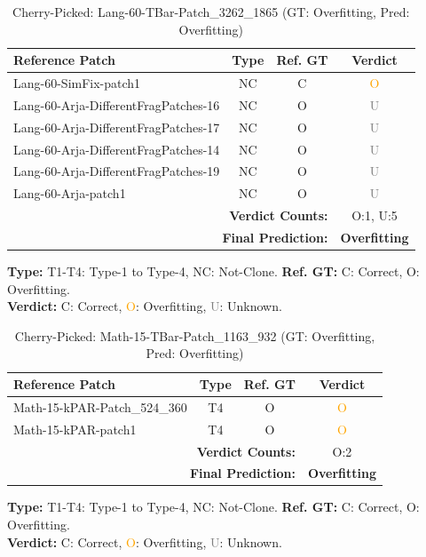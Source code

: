 \begin{table}[t]
\centering
\caption{Cherry-Picked: Lang-60-TBar-Patch\_3262\_1865 (GT: Overfitting, Pred: Overfitting)}
\label{tab:cherry-Lang60TBarPatch32621865}
\footnotesize
\renewcommand{\arraystretch}{1.1}
\setlength{\tabcolsep}{4pt}
\begin{tabular}{l|c|c|c}
\hline
\textbf{Reference Patch} & \textbf{Type} & \textbf{Ref. GT} & \textbf{Verdict} \\
\hline
Lang-60-SimFix-patch1 & NC & C & \textcolor{orange}{O} \\
Lang-60-Arja-DifferentFragPatches-16 & NC & O & \textcolor{gray}{U} \\
Lang-60-Arja-DifferentFragPatches-17 & NC & O & \textcolor{gray}{U} \\
Lang-60-Arja-DifferentFragPatches-14 & NC & O & \textcolor{gray}{U} \\
Lang-60-Arja-DifferentFragPatches-19 & NC & O & \textcolor{gray}{U} \\
Lang-60-Arja-patch1 & NC & O & \textcolor{gray}{U} \\
\hline
\multicolumn{3}{r|}{\textbf{Verdict Counts:}} & O:1, U:5 \\
\multicolumn{3}{r|}{\textbf{Final Prediction:}} & \textbf{Overfitting} \\
\hline
\end{tabular}
\vspace{1mm}
\parbox{\linewidth}{\centering\footnotesize 
\vspace{1mm}
\textbf{Type:} T1-T4: Type-1 to Type-4, NC: Not-Clone. \;
\textbf{Ref. GT:} C: Correct, O: Overfitting. \\
\textbf{Verdict:} \textcolor{green!60!black}{C}: Correct, \textcolor{orange}{O}: Overfitting, \textcolor{gray}{U}: Unknown.}
\end{table}


\begin{table}[t]
\centering
\caption{Cherry-Picked: Math-15-TBar-Patch\_1163\_932 (GT: Overfitting, Pred: Overfitting)}
\label{tab:cherry-Math15TBarPatch1163932}
\footnotesize
\renewcommand{\arraystretch}{1.1}
\setlength{\tabcolsep}{4pt}
\begin{tabular}{l|c|c|c}
\hline
\textbf{Reference Patch} & \textbf{Type} & \textbf{Ref. GT} & \textbf{Verdict} \\
\hline
Math-15-kPAR-Patch\_524\_360 & T4 & O & \textcolor{orange}{O} \\
Math-15-kPAR-patch1 & T4 & O & \textcolor{orange}{O} \\
\hline
\multicolumn{3}{r|}{\textbf{Verdict Counts:}} & O:2 \\
\multicolumn{3}{r|}{\textbf{Final Prediction:}} & \textbf{Overfitting} \\
\hline
\end{tabular}
\vspace{1mm}
\parbox{\linewidth}{\centering\footnotesize 
\vspace{1mm}
\textbf{Type:} T1-T4: Type-1 to Type-4, NC: Not-Clone. \;
\textbf{Ref. GT:} C: Correct, O: Overfitting. \\
\textbf{Verdict:} \textcolor{green!60!black}{C}: Correct, \textcolor{orange}{O}: Overfitting, \textcolor{gray}{U}: Unknown.}
\end{table}


